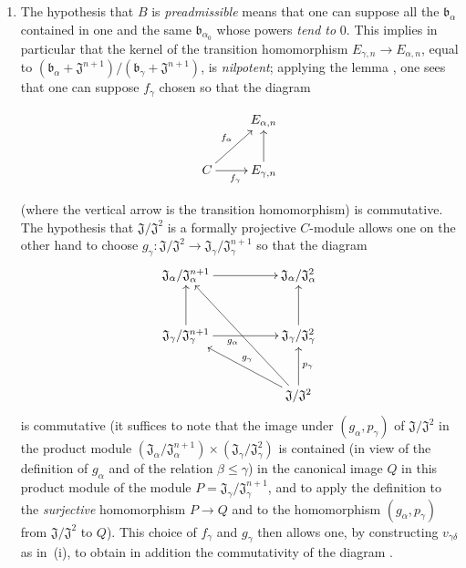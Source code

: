 \begin{enumerate}
  \item[\rm(ii)] The hypothesis that $B$ is \emph{preadmissible} means that one can suppose all the $\mathfrak{b}_\alpha$ contained in one and the same $\mathfrak{b}_{\alpha_0}$ whose powers \emph{tend to} $0$.
  This implies in particular that the kernel of the transition homomorphism $E_{\gamma,n}\to E_{\alpha,n}$, equal to $(\mathfrak{b}_\alpha+\mathfrak{J}^{n+1})/(\mathfrak{b}_\gamma+\mathfrak{J}^{n+1})$, is \emph{nilpotent};
  applying the lemma , one sees that one can suppose $f_\gamma$ chosen so that the diagram
  
\[
\xymatrix{
      & E_{\alpha,n} \\
      C \ar[ur]^{f_\alpha} \ar[r]_{f_\gamma} & E_{\gamma,n} \ar[u]
    }
\]

  (where the vertical arrow is the transition homomorphism) is commutative.
  The hypothesis that $\mathfrak{J}/\mathfrak{J}^2$ is a formally projective $C$-module allows one on the other hand to choose $g_\gamma:\mathfrak{J}/\mathfrak{J}^2\to\mathfrak{J}_\gamma/\mathfrak{J}_\gamma^{n+1}$ so that the diagram
  \[
    \xymatrix@C=5em@R=3em{
      \mathfrak{J}_\alpha/\mathfrak{J}_\alpha^{n+1} \ar[r] &
      \mathfrak{J}_\alpha/\mathfrak{J}_\alpha^2 \\
      \mathfrak{J}_\gamma/\mathfrak{J}_\gamma^{n+1} \ar[u] \ar[r] &
      \mathfrak{J}_\gamma/\mathfrak{J}_\gamma^2 \ar[u] \\
      & \mathfrak{J}/\mathfrak{J}^2
        \ar[ul]_{g_\gamma} \ar[u]_{p_\gamma} \ar[uul]^{g_\alpha}
    }
  \]
  is commutative (it suffices to note that the image under $(g_\alpha,p_\gamma)$
  of $\mathfrak{J}/\mathfrak{J}^2$ in the product module
  $(\mathfrak{J}_\alpha/\mathfrak{J}_\alpha^{n+1})
  \times(\mathfrak{J}_\gamma/\mathfrak{J}_\gamma^2)$ is contained (in view of
  the definition of $g_\alpha$ and of the relation $\beta\leq\gamma$) in the
  canonical image $Q$ in this product module of the
  module
  $P=\mathfrak{J}_\gamma/\mathfrak{J}_\gamma^{n+1}$, and to apply the definition
   to the \emph{surjective} homomorphism $P\to Q$ and to the
  homomorphism $(g_\alpha,p_\gamma)$ from $\mathfrak{J}/\mathfrak{J}^2$ to $Q$).
  This choice of $f_\gamma$ and $g_\gamma$ then allows one, by constructing
  $v_{\gamma\delta}$ as in~{\rm(i)}, to obtain in addition the commutativity of
  the diagram .
\end{enumerate}

